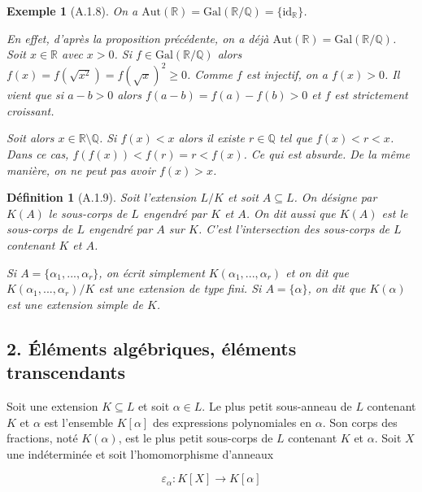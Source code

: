 \documentclass[12pts,a4paper]{report}
\newtheorem{definition}{Définition}
\newtheorem{exemple}{Exemple}
\begin{document}
\begin{exemple}[A.1.8]
On a \( \text{Aut}(\mathbb{R}) = \text{Gal}(\mathbb{R}/\mathbb{Q}) = \{\text{id}_{\mathbb{R}}\} \).

En effet, d'après la proposition précédente, on a déjà \( \text{Aut}(\mathbb{R}) = \text{Gal}(\mathbb{R}/\mathbb{Q}) \). Soit \( x \in \mathbb{R} \) avec \( x > 0 \). Si \( f \in \text{Gal}(\mathbb{R}/\mathbb{Q}) \) alors \( f(x) = f(\sqrt{x^2}) = f(\sqrt{x})^2 \geq 0 \). Comme \( f \) est injectif, on a \( f(x) > 0 \). Il vient que si \( a - b > 0 \) alors \( f(a - b) = f(a) - f(b) > 0 \) et \( f \) est strictement croissant.

Soit alors \( x \in \mathbb{R} \setminus \mathbb{Q} \). Si \( f(x) < x \) alors il existe \( r \in \mathbb{Q} \) tel que \( f(x) < r < x \). Dans ce cas, \( f(f(x)) < f(r) = r < f(x) \). Ce qui est absurde. De la même manière, on ne peut pas avoir \( f(x) > x \).
\end{exemple}

\begin{definition}[A.1.9]
Soit l'extension \( L/K \) et soit \( A \subseteq L \). On désigne par \( K(A) \) le sous-corps de \( L \) engendré par \( K \) et \( A \). On dit aussi que \( K(A) \) est le sous-corps de \( L \) engendré par \( A \) sur \( K \). C'est l'intersection des sous-corps de \( L \) contenant \( K \) et \( A \).

Si \( A = \{\alpha_1, ..., \alpha_r\} \), on écrit simplement \( K(\alpha_1, ..., \alpha_r) \) et on dit que \( K(\alpha_1, ..., \alpha_r)/K \) est une extension de type fini. Si \( A = \{\alpha\} \), on dit que \( K(\alpha) \) est une extension simple de \( K \).
\end{definition}

\subsection*{2. Éléments algébriques, éléments transcendants}

Soit une extension \( K \subseteq L \) et soit \( \alpha \in L \). Le plus petit sous-anneau de \( L \) contenant \( K \) et \( \alpha \) est l'ensemble \( K[\alpha] \) des expressions polynomiales en \( \alpha \). Son corps des fractions, noté \( K(\alpha) \), est le plus petit sous-corps de \( L \) contenant \( K \) et \( \alpha \). Soit \( X \) une indéterminée et soit l'homomorphisme d'anneaux

\[
\varepsilon_\alpha : K[X] \longrightarrow K[\alpha]
\]
\end{document}
